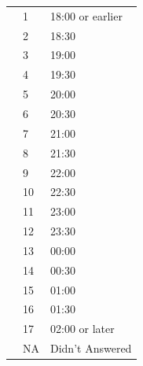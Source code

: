 \begin{table}[H]
\begin{tabular}{l | l | l}
            	& \multicolumn{1}{l}{1}     & \multicolumn{1}{l}{18:00 or earlier}                 \\\cline{2-3}
                & \multicolumn{1}{l}{2}     & \multicolumn{1}{l}{18:30}   \\\cline{2-3}
				& \multicolumn{1}{l}{3}     & \multicolumn{1}{l}{19:00} \\\cline{2-3}
				& \multicolumn{1}{l}{4}     & \multicolumn{1}{l}{19:30}   \\\cline{2-3}
            	& \multicolumn{1}{l}{5}     & \multicolumn{1}{l}{20:00}                 \\\cline{2-3}
                & \multicolumn{1}{l}{6}     & \multicolumn{1}{l}{20:30}   \\\cline{2-3}
				& \multicolumn{1}{l}{7}     & \multicolumn{1}{l}{21:00} \\\cline{2-3}
				& \multicolumn{1}{l}{8}     & \multicolumn{1}{l}{21:30}   \\\cline{2-3}
            	& \multicolumn{1}{l}{9}     & \multicolumn{1}{l}{22:00}                 \\\cline{2-3}
                & \multicolumn{1}{l}{10}    & \multicolumn{1}{l}{22:30}   \\\cline{2-3}
				& \multicolumn{1}{l}{11}    & \multicolumn{1}{l}{23:00} \\\cline{2-3}
				& \multicolumn{1}{l}{12}    & \multicolumn{1}{l}{23:30}   \\\cline{2-3}
            	& \multicolumn{1}{l}{13}    & \multicolumn{1}{l}{00:00}                 \\\cline{2-3}
                & \multicolumn{1}{l}{14}    & \multicolumn{1}{l}{00:30}   \\\cline{2-3}
				& \multicolumn{1}{l}{15}    & \multicolumn{1}{l}{01:00} \\\cline{2-3}
				& \multicolumn{1}{l}{16}    & \multicolumn{1}{l}{01:30}   \\\cline{2-3}															& \multicolumn{1}{l}{17}    & \multicolumn{1}{l}{02:00 or later}   \\\cline{2-3}								
				& \multicolumn{1}{l}{NA}    & \multicolumn{1}{l}{Didn't Answered}              \\\hline                                                                                                

        \end{tabular}

    

\end{table}

